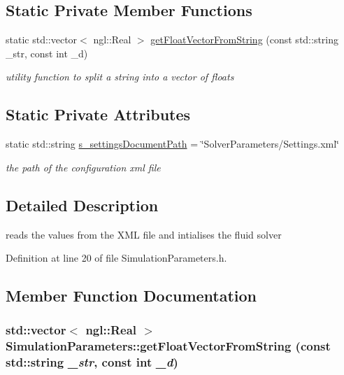 \subsection*{Static Private Member Functions}
\begin{DoxyCompactItemize}
\item 
static std::vector$<$ ngl::Real $>$ \hyperlink{class_simulation_parameters_ab6ed6ff4568848297f4a50603093d3d5}{getFloatVectorFromString} (const std::string \_\-str, const int \_\-d)
\begin{DoxyCompactList}\small\item\em utility function to split a string into a vector of floats \item\end{DoxyCompactList}\end{DoxyCompactItemize}
\subsection*{Static Private Attributes}
\begin{DoxyCompactItemize}
\item 
static std::string \hyperlink{class_simulation_parameters_a31c9b138fd6c5519bdd51ac56c59a303}{s\_\-settingsDocumentPath} = \char`\"{}SolverParameters/Settings.xml\char`\"{}
\begin{DoxyCompactList}\small\item\em the path of the configuration xml file \item\end{DoxyCompactList}\end{DoxyCompactItemize}


\subsection{Detailed Description}
reads the values from the XML file and intialises the fluid solver 

Definition at line 20 of file SimulationParameters.h.



\subsection{Member Function Documentation}
\hypertarget{class_simulation_parameters_ab6ed6ff4568848297f4a50603093d3d5}{
\subsubsection[{getFloatVectorFromString}]{\setlength{\rightskip}{0pt plus 5cm}std::vector$<$ ngl::Real $>$ SimulationParameters::getFloatVectorFromString (const std::string {\em \_\-str}, \/  const int {\em \_\-d})}}
\label{class_simulation_parameters_ab6ed6ff4568848297f4a50603093d3d5}


